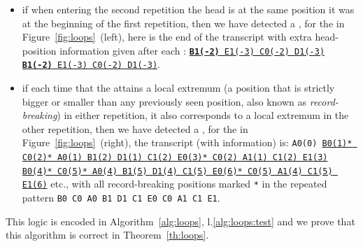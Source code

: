 \begin{itemize}
    \item if when entering the second repetition the head is at the same position it was at the beginning of the first repetition, then we have detected a \cycler, \eg for the \cycler in Figure~\ref{fig:loops}~(left), here is the end of the transcript with extra head-position information given after each \ssp: \texttt{\underline{\textbf{B1(-2)} E1(-3) C0(-2) D1(-3)} \underline{\textbf{B1(-2)} E1(-3) C0(-2) D1(-3)}}.

    \item if each time that the \headpos attains a local extremum (\ie a position that is strictly bigger or smaller than any previously seen position, also known as \textit{record-breaking}) in either repetition, it also corresponds to a local extremum in the other repetition, then we have detected a \TC, \eg for the \TC in Figure~\ref{fig:loops}~(right), the transcript (with \headpos information) is: \texttt{A0(0) \underline{B0(1)* C0(2)* A0(1) B1(2) D1(1) C1(2) E0(3)* C0(2) A1(1) C1(2) E1(3)} \\ \underline{B0(4)* C0(5)* A0(4) B1(5) D1(4) C1(5) E0(6)* C0(5) A1(4) C1(5) E1(6)}} etc., with all record-breaking positions marked \texttt{*} in the repeated \ssp pattern \texttt{B0 C0 A0 B1 D1 C1 E0 C0 A1 C1 E1}.

\end{itemize}

This logic is encoded in Algorithm~\ref{alg:loops}, l.\ref{alg:loops:test} and we prove that this algorithm is correct in Theorem~\ref{th:loops}.

